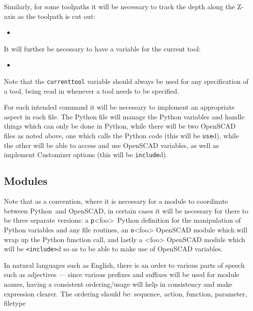 \documentclass{ltxdoc}
\begin{document}
\begin{samepage}
\noindent Similarly, for some toolpaths it will be necessary to track the depth along the Z-axis
as the toolpath is cut out:
 
\begin{itemize}
 \item {}
\end{itemize}
\end{samepage}

\begin{samepage}
\noindent It will further be necessary to have a variable for the current tool:

\begin{itemize}
 \item {}
\end{itemize}
\end{samepage}

Note that the \verb|currenttool| variable should always be used for any specification 
of a tool, being read in whenever a tool needs to be specified. %

For each intended command it will be necessary to implement an appropriate aspect in each file. 
The Python file will manage the Python variables and handle things which can only be done in 
Python, while there will be two OpenSCAD files as noted above, one which calls the Python code 
(this will be \texttt{use}d), while the other will be able to access
and use OpenSCAD variables, as well as implement Customizer options
(this will be \texttt{include}d).

\subsection{Modules}

Note that as a convention, where it is necessary for a module to coordinate between 
Python~and OpenSCAD, in certain cases it will be necessary for there to be three separate 
versions: a \texttt{p}<foo>~Python definition for the manipulation of Python variables and
any file routines, an \texttt{o}<foo> OpenSCAD module which will wrap up the Python
function call, and lastly a <foo> OpenSCAD module which will be \texttt{<include>}d 
so as to be able to make use of OpenSCAD variables.

In natural languages such as English, there is an order to various parts of speech such as 
adjectives 
--- since various prefixes and suffixes will be used for module names, having a consistent 
ordering/usage will help in consistency and make expression clearer.
The ordering should be: sequence, action, function, parameter, filetype
\end{document}
